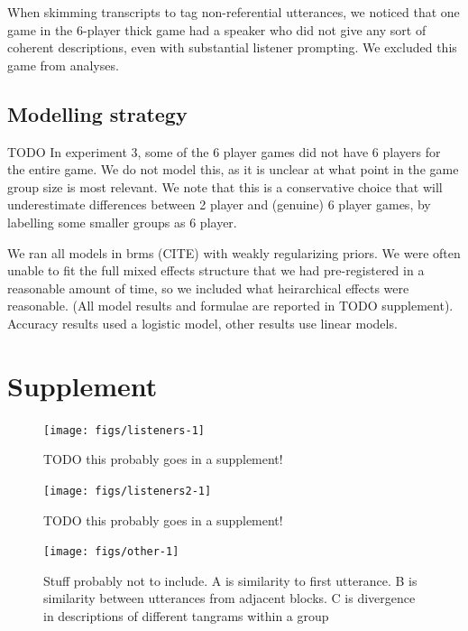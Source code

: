 \documentclass[
  english,
  a4paper,
]{article}
\begin{document}
When skimming transcripts to tag non-referential utterances, we noticed that one game in the 6-player thick game had a speaker who did not give any sort of coherent descriptions, even with substantial listener prompting. We excluded this game from analyses.

\hypertarget{modelling-strategy}{%
\subsection{Modelling strategy}\label{modelling-strategy}}

TODO
In experiment 3, some of the 6 player games did not have 6 players for the entire game. We do not model this, as it is unclear at what point in the game group size is most relevant. We note that this is a conservative choice that will underestimate differences between 2 player and (genuine) 6 player games, by labelling some smaller groups as 6 player.

We ran all models in brms (CITE) with weakly regularizing priors. We were often unable to fit the full mixed effects structure that we had pre-registered in a reasonable amount of time, so we included what heirarchical effects were reasonable. (All model results and formulae are reported in TODO supplement). Accuracy results used a logistic model, other results use linear models.

\hypertarget{supplement}{%
\section{Supplement}\label{supplement}}

\begin{figure}[t!]

{\centering \texttt{[image: figs/listeners-1]} 

}

\caption{TODO this probably goes in a supplement! }\label{fig:listeners}
\end{figure}

\begin{figure}[t!]

{\centering \texttt{[image: figs/listeners2-1]} 

}

\caption{TODO this probably goes in a supplement! }\label{fig:listeners2}
\end{figure}

\begin{figure}[t!]

{\centering \texttt{[image: figs/other-1]} 

}

\caption{Stuff probably not to include. A is similarity to first utterance. B is similarity between utterances from adjacent blocks. C is divergence in descriptions of different tangrams within a group}\label{fig:other}
\end{figure}
\end{document}
